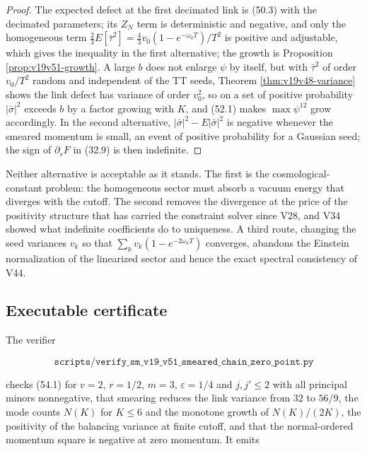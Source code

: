 \documentclass[11pt]{article}
\theoremstyle{remark}
\begin{document}
\begin{proof}
The expected defect at the first decimated link is (50.3) with the
decimated parameters; its \(Z_N\) term is deterministic and negative,
and only the homogeneous term \(\tfrac23E[\bar\tau^2]=\tfrac43v_0(1-e^{-\omega_0T})/T^2\)
is positive and adjustable, which gives the inequality in the first
alternative; the growth is Proposition \ref{prop:v19v51-growth}.  A
large \(b\) does not enlarge \(\psi\) by itself, but with
\(\bar\tau^2\) of order \(v_0/T^2\) random and independent of the TT
seeds, Theorem \ref{thm:v19v48-variance} shows the link defect has
variance of order \(v_0^2\), so on a set of positive probability
\(|\bar\sigma|^2\) exceeds \(b\) by a factor growing with \(K\), and
(52.1) makes \(\max\psi^{12}\) grow accordingly.  In the second
alternative, \(|\bar\sigma|^2-E|\bar\sigma|^2\) is negative whenever
the smeared momentum is small, an event of positive probability for a
Gaussian seed; the sign of \(\partial_sF\) in (32.9) is then
indefinite.
\end{proof}

Neither alternative is acceptable as it stands.  The first is the
cosmological-constant problem: the homogeneous sector must absorb a
vacuum energy that diverges with the cutoff.  The second removes the
divergence at the price of the positivity structure that has carried
the constraint solver since V28, and V34 showed what indefinite
coefficients do to uniqueness.  A third route, changing the seed
variances \(v_k\) so that \(\sum_kv_k(1-e^{-2\omega_kT})\) converges,
abandons the Einstein normalization of the linearized sector and hence
the exact spectral consistency of V44.

\subsection{Executable certificate}

The verifier

\[
 \texttt{scripts/verify\_sm\_v19\_v51\_smeared\_chain\_zero\_point.py}
                                                                    \tag{54.4}
\]

checks (54.1) for \(v=2\), \(r=1/2\), \(m=3\), \(\varepsilon=1/4\)
and \(j,j'\leq2\) with all principal minors nonnegative, that
smearing reduces the link variance from \(32\) to \(56/9\), the mode
counts \(N(K)\) for \(K\leq6\) and the monotone growth of
\(N(K)/(2K)\), the positivity of the balancing variance at finite
cutoff, and that the normal-ordered momentum square is negative at zero
momentum.  It emits
\end{document}
